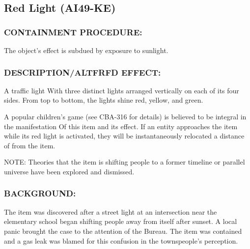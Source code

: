 \subsection*{Red Light (AI49-KE)}
\subsubsection*{CONTAINMENT PROCEDURE:}
\par The object's effect is subdued by
exposure to sunlight.
\subsubsection*{DESCRIPTION/ALTFRFD EFFECT:}
\par A traffic light With three distinct lights
arranged vertically on each of its four
sides. From top to bottom, the lights
shine red, yellow, and green.
\par A popular children's game (see CBA-316 for details) is believed
to be integral in the manifestation Of this item and its effect. If an
entity approaches the item while its red light is activated, they will
be instantaneously relocated a distance of  from the
item.

\par NOTE: Theories that the item is shifting people to a former
timeline or parallel universe have been explored and dismissed.
\subsubsection*{BACKGROUND:}
\par The item was discovered after a street light at an intersection
near the elementary school began shifting people away from itself
after sunset. A local panic brought the case to the attention of the
Bureau. The item was contained and a gas leak was blamed for
this confusion in the townspeople's perception.